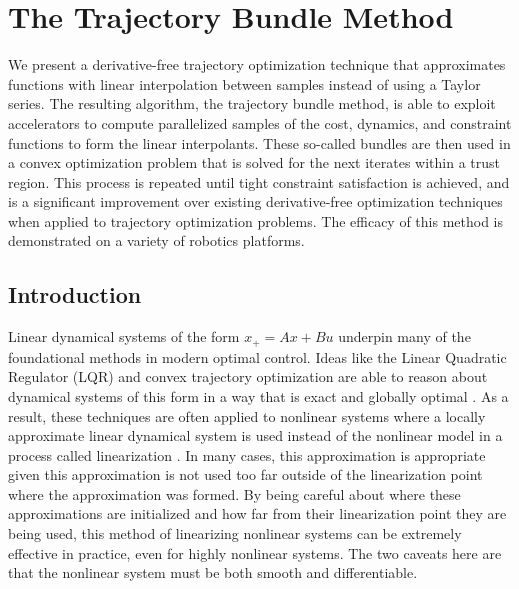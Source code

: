 \graphicspath{{bundles/}}


\chapter{The Trajectory Bundle Method}
\label{sec:bundles}
We present a derivative-free trajectory optimization technique that approximates functions with linear interpolation between samples instead of using a Taylor series. The resulting algorithm, the trajectory bundle method, is able to exploit accelerators to compute parallelized samples of the cost, dynamics, and constraint functions to form the linear interpolants. These so-called bundles are then used in a convex optimization problem that is solved for the next iterates within a trust region. This process is repeated until tight constraint satisfaction is achieved, and is a significant improvement over existing derivative-free optimization techniques when applied to trajectory optimization problems. The efficacy of this method is demonstrated on a variety of robotics platforms.


\section{Introduction}\label{sec:bundles:introduction}
Linear dynamical systems of the form $x_{+} = Ax + Bu$ underpin many of the foundational methods in modern optimal control. Ideas like the Linear Quadratic Regulator (LQR) and convex trajectory optimization are able to reason about dynamical systems of this form in a way that is exact and globally optimal \cite{kalman1960,borrelli2017,boyd2004}. As a result, these techniques are often applied to nonlinear systems where a locally approximate linear dynamical system is used instead of the nonlinear model in a process called linearization \cite{slotine1991}. In many cases, this approximation is appropriate given this approximation is not used too far outside of the linearization point where the approximation was formed. By being careful about where these approximations are initialized and how far from their linearization point they are being used, this method of linearizing nonlinear systems can be extremely effective in practice, even for highly nonlinear systems.  The two caveats here are that the nonlinear system must be both smooth and differentiable. 

